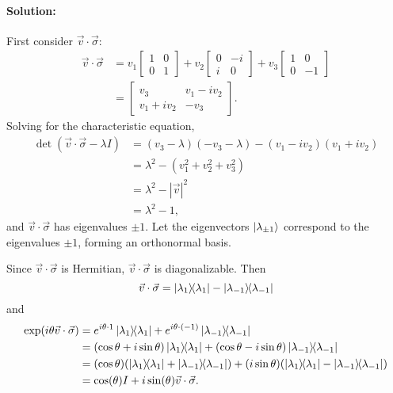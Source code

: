 \documentclass{article}
\begin{document}
\paragraph{Solution:} First consider $\vec{v} \cdot \vec{\sigma}$:
\begin{align*}
  \vec{v} \cdot \vec{\sigma} &= v_1 \begin{bmatrix}
      1 & 0 \\
      0 & 1
    \end{bmatrix} + v_2 \begin{bmatrix}
      0 & -i \\
      i & 0
    \end{bmatrix} + v_3 \begin{bmatrix}
      1 & 0 \\
      0 & -1
    \end{bmatrix} \\
    &= \begin{bmatrix}
      v_3 & v_1 - iv_2 \\
      v_1 + iv_2 & - v_3
    \end{bmatrix}.
\end{align*}
Solving for the characteristic equation, \begin{align*}
  \det(\vec{v} \cdot \vec{\sigma} - \lambda I)
    &= (v_3 - \lambda)(-v_3 - \lambda) - (v_1 - iv_2)(v_1 + iv_2) \\
    &= \lambda^2 - (v_1^2 + v_2^2 + v_3^2) \\
    &= \lambda^2 - |\vec{v}|^2 \\
    &= \lambda^2 - 1,
\end{align*} and $\vec{v} \cdot \vec{\sigma}$ has eigenvalues $\pm 1$. Let
the eigenvectors $\ket{\lambda_{\pm 1}}$ correspond to the eigenvalues $\pm 1$,
forming an orthonormal basis.

Since $\vec{v} \cdot \vec{\sigma}$ is Hermitian, $\vec{v} \cdot \vec{\sigma}$
is diagonalizable. Then \begin{equation*}
  \vec{v} \cdot \vec{\sigma} = \ketbra{\lambda_1}{\lambda_1} -
    \ketbra{\lambda_{-1}}{\lambda_{-1}}
\end{equation*}
and \begin{align*}
  \mathrm{exp}(i\theta\vec{v} \cdot \vec{\sigma})
    &= e^{i\theta \cdot 1} \ketbra{\lambda_1}{\lambda_1} +
      e^{i\theta \cdot (-1)} \ketbra{\lambda_{-1}}{\lambda_{-1}} \\
    &= (\cos\theta + i\sin\theta) \ketbra{\lambda_1}{\lambda_1} +
      (\cos\theta - i\sin\theta) \ketbra{\lambda_{-1}}{\lambda_{-1}} \\
    &= (\cos\theta)(\ketbra{\lambda_1}{\lambda_1} + \ketbra{\lambda_{-1}}
      {\lambda_{-1}}) + (i\sin\theta)(\ketbra{\lambda_1}{\lambda_1} -
      \ketbra{\lambda_{-1}}{\lambda_{-1}}) \\
    &= \cos(\theta) I + i\sin(\theta) \vec{v} \cdot \vec{\sigma}.
\end{align*}
\end{document}
